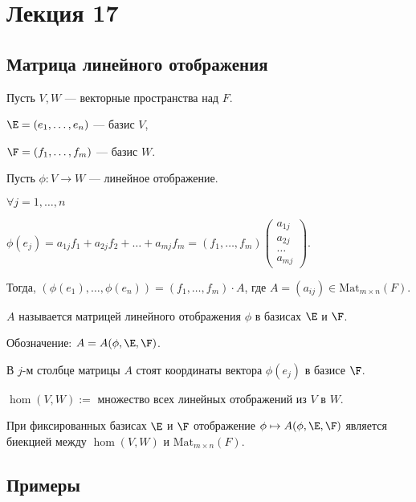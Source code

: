 \section{Лекция 17}

\subsection{Матрица линейного отображения}

Пусть $V, W$ --- векторные пространства над $F$.

$\E = (e_1, \dots, e_n)$ --- базис $V$,

$\F = (f_1, \dots, f_m)$ --- базис $W$.

\bigskip
Пусть $\phi\colon V \to W$ --- линейное отображение.

$\forall j = 1, \dots, n$

$\phi(e_j) = a_{1j} f_1 + a_{2j} f_2 + \dots + a_{mj} f_m = (f_1, \dots, f_m) \begin{pmatrix} a_{1j} \\ a_{2j} \\ \dots \\ a_{mj} \end{pmatrix}$.

Тогда, $(\phi(e_1), \dots, \phi(e_n)) = (f_1, \dots, f_m) \cdot A$, где $A = (a_{ij}) \in \text{Mat}_{m \times n} (F)$.

\begin{definition}
    $A$ называется матрицей линейного отображения $\phi$ в базисах $\E$ и $\F$.

    Обозначение: $A = A(\phi, \E, \F)$.
\end{definition}

В $j$-м столбце матрицы $A$ стоят координаты вектора $\phi(e_j)$ в базисе $\F$.

\begin{designation}
    $\hom(V, W) := $ множество всех линейных отображений из $V$ в $W$.
\end{designation}

\begin{corollary}
    При фиксированных базисах $\E$ и $\F$ отображение $\phi \mapsto A(\phi, \E, \F)$ является биекцией между $\hom(V, W)$ и $\text{Mat}_{m \times n}(F)$.
\end{corollary}


\subsection{Примеры}

